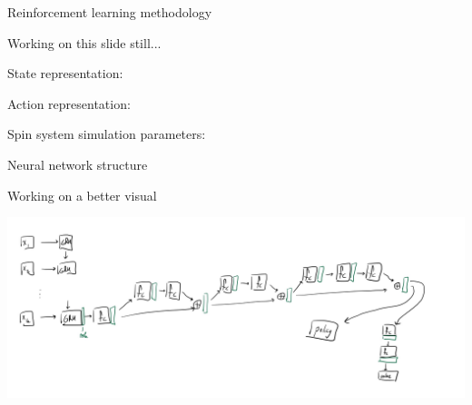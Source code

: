 \documentclass{beamer}
\begin{document}
\begin{frame}{Reinforcement learning methodology}


Working on this slide still...

State representation:

Action representation:

Spin system simulation parameters:


\end{frame}

\begin{frame}{Neural network structure}

Working on a better visual

\includegraphics[width=.8\textwidth]{nn_structure.jpg}

\end{frame}
\end{document}
